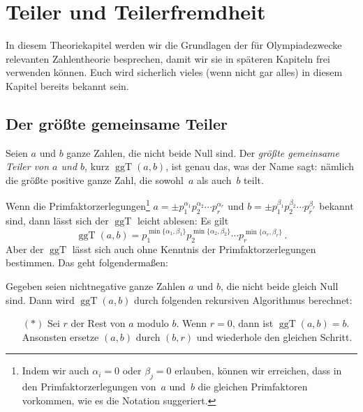 \section{Teiler und Teilerfremdheit}\label{kapitel:Teilerfremdheit}
In diesem Theoriekapitel werden wir die Grundlagen der für Olympiadezwecke relevanten Zahlentheorie besprechen, damit wir sie in späteren Kapiteln frei verwenden können. Euch wird sicherlich vieles (wenn nicht gar alles) in diesem Kapitel bereits bekannt sein.

\subsection*{Der größte gemeinsame Teiler}
\begin{definition}
	Seien $a$ und $b$ ganze Zahlen, die nicht beide Null sind. Der \emph{größte gemeinsame Teiler von $a$ und $b$}, kurz $\operatorname{ggT}(a,b)$, ist genau das, was der Name sagt: nämlich die größte positive ganze Zahl, die sowohl~$a$ als auch~$b$ teilt.
\end{definition}
Wenn die Primfaktorzerlegungen\footnote{Indem wir auch $\alpha_i=0$ oder $\beta_j=0$ erlauben, können wir erreichen, dass in den Primfaktorzerlegungen von~$a$ und~$b$ die gleichen Primfaktoren vorkommen, wie es die Notation suggeriert.} $a=\pm p_1^{\alpha_1}p_2^{\alpha_2}\dotsm p_r^{\alpha_r}$ und $b=\pm p_1^{\beta_1}p_2^{\beta_2}\dotsm p_r^{\beta_r}$ bekannt sind, dann lässt sich der $\operatorname{ggT}$ leicht ablesen: Es gilt
\begin{equation*}
	\operatorname{ggT}(a,b)=p_1^{\min\{\alpha_1,\beta_1\}}p_2^{\min\{\alpha_2,\beta_2\}}\dotsm p_r^{\min\{\alpha_r,\beta_r\}}\,.
\end{equation*}
Aber der $\operatorname{ggT}$ lässt sich auch ohne Kenntnis der Primfaktorzerlegungen bestimmen. Das geht folgendermaßen:
\begin{satzmitnamen}
	Gegeben seien nichtnegative ganze Zahlen $a$ und $b$, die nicht beide gleich Null sind. Dann wird $\operatorname{ggT}(a,b)$ durch folgenden rekursiven Algorithmus berechnet:
	\begin{enumerate}
		\item[$(*)$] Sei $r$ der Rest von $a$ modulo $b$. Wenn $r=0$, dann ist $\operatorname{ggT}(a,b)=b$. Ansonsten ersetze $(a,b)$ durch $(b,r)$ und wiederhole den gleichen Schritt.
	\end{enumerate}
\end{satzmitnamen}
